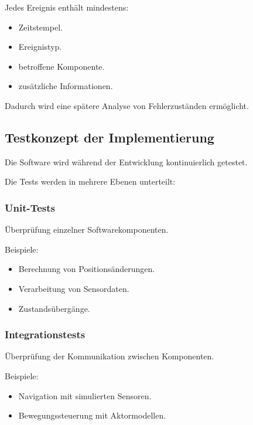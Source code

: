 \documentclass[
  a4paper,
  12pt,
  DIV=12,        %
  parskip=half,  %
  headings=small %
]{scrartcl}
\theoremstyle{definition}
\providecommand{\tightlist}{%
  \setlength{\itemsep}{0pt}\setlength{\parskip}{0pt}}
\theoremstyle{definition}
\begin{document}
Jedes Ereignis enthält mindestens:

\begin{itemize}
\tightlist
\item
  Zeitstempel.
\item
  Ereignistyp.
\item
  betroffene Komponente.
\item
  zusätzliche Informationen.
\end{itemize}

Dadurch wird eine spätere Analyse von Fehlerzuständen ermöglicht.

\subsection{Testkonzept der
Implementierung}\label{testkonzept-der-implementierung}

Die Software wird während der Entwicklung kontinuierlich getestet.

Die Tests werden in mehrere Ebenen unterteilt:

\subsubsection{Unit-Tests}\label{unit-tests}

Überprüfung einzelner Softwarekomponenten.

Beispiele:

\begin{itemize}
\tightlist
\item
  Berechnung von Positionsänderungen.
\item
  Verarbeitung von Sensordaten.
\item
  Zustandsübergänge.
\end{itemize}

\subsubsection{Integrationstests}\label{integrationstests}

Überprüfung der Kommunikation zwischen Komponenten.

Beispiele:

\begin{itemize}
\tightlist
\item
  Navigation mit simulierten Sensoren.
\item
  Bewegungssteuerung mit Aktormodellen.
\end{itemize}
\end{document}
